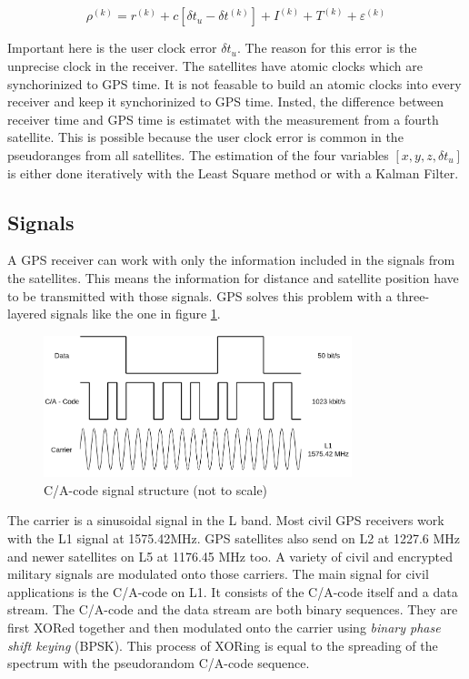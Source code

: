 \begin{equation}
 \rho^{(k)} = r^{(k)} + c[\delta t_u - \delta t^{(k)}] + I^{(k)} + T^{(k)} + \varepsilon^{(k)}		\label{eq:pseudorange}
\end{equation}

Important here is the user clock error $\delta t_u$.
The reason for this error is the unprecise clock in the receiver.
The satellites have atomic clocks which are synchorinized to GPS time.
It is not feasable to build an atomic clocks into every receiver and keep it synchorinized to GPS time.
Insted, the difference between receiver time and GPS time is estimatet with the measurement from a fourth satellite.
This is possible because the user clock error is common in the pseudoranges from all satellites.
The estimation of the four variables $[x, y, z, \delta t_u]$ is either done iteratively with the Least Square method or with a Kalman Filter.

\subsection{Signals}

A GPS receiver can work with only the information included in the signals from the satellites.
This means the information for distance and satellite position have to be transmitted with those signals.
GPS solves this problem with a three-layered signals like the one in figure \ref{fig:signal_structure}.

\begin{figure}[ht]
 \centering
 \includegraphics[width=0.8\textwidth]{images/Signal_Structure.png}
 \caption{C/A-code signal structure (not to scale)}
 \label{fig:signal_structure}
\end{figure}

The carrier is a sinusoidal signal in the L band.
Most civil GPS receivers work with the L1 signal at 1575.42MHz.
GPS satellites also send on L2 at 1227.6 MHz and newer satellites on L5 at 1176.45 MHz too.
A variety of civil and encrypted military signals are modulated onto those carriers.
The main signal for civil applications is the C/A-code on L1.
It consists of the C/A-code itself and a data stream.
The C/A-code and the data stream are both binary sequences.
They are first XORed together and then modulated onto the carrier using \textit{binary phase shift keying} (BPSK).
This process of XORing is equal to the spreading of the spectrum with the pseudorandom C/A-code sequence.

